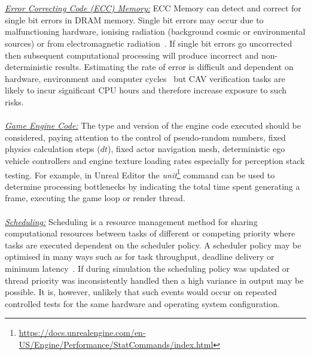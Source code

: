 \documentclass[letterpaper, 10 pt, journal, twoside]{IEEEtran}
\begin{document}
\\\\
\noindent\underline{\textit{Error Correcting Code (ECC) Memory:}}
ECC Memory can detect and correct for single bit errors in DRAM memory. Single bit errors may occur due to malfunctioning hardware, ionising radiation (background cosmic or environmental sources) or from electromagnetic radiation~\cite{dodd2003basic}. If single bit errors go uncorrected then subsequent computational processing will produce incorrect and non-deterministic results. Estimating the rate of error is difficult and dependent on hardware, environment and computer cycles~\cite{mielke2008bit} but CAV verification tasks are likely to incur significant CPU hours and therefore increase exposure to such risks.
\\\\
\noindent\underline{\textit{Game Engine Code:}}
The type and version of the engine code executed should be considered, paying attention to the control of pseudo-random numbers, fixed physics calculation steps ($dt$), fixed actor navigation mesh, deterministic ego vehicle controllers and engine texture loading rates especially for perception stack testing. %
For example, in Unreal Editor the \textit{unit}\footnote{\url{https://docs.unrealengine.com/en-US/Engine/Performance/StatCommands/index.html}} command can be used to determine processing bottlenecks by indicating the total time spent generating a frame, executing the game loop or render thread.
\\\\
\noindent\underline{\textit{Scheduling:}} %
Scheduling is a resource management method for sharing computational resources between tasks of different or competing priority where tasks are executed  dependent on the scheduler policy. A scheduler policy may be optimised in many ways such as for task throughput, deadline delivery or minimum latency~\cite{liu1973scheduling}. 
%
If during simulation the scheduling policy was updated or thread priority was inconsistently handled then a high variance in output may be possible. It is, however, unlikely that such events would occur on repeated controlled tests for the same hardware and operating system configuration. %
\end{document}
